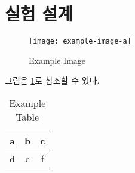 \section{실험 설계}
\begin{figure}[htbp]
	\centering
	\texttt{[image: example-image-a]}
	\caption{Example Image}
        \label{dg}
\end{figure}

그림은 \cref{dg}로 참조할 수 있다.
\begin{table}[htbp]
	\centering
	\caption{Example Table}
	\begin{tabular}{|c|c|c|}
		\hline
		a & b & c \\\hline
		d & e & f \\\hline
	\end{tabular}
\end{table}